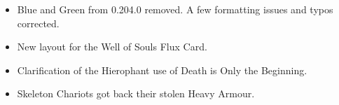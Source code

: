 
\subtitle{Layout}

\begin{itemize}[label={-}]
\item Blue and Green from 0.204.0 removed. A few formatting issues and typos corrected.
\item New layout for the Well of Souls Flux Card.
\end{itemize}


\subtitle{Model Rules}

\begin{itemize}[label={-}]
\item Clarification of the Hierophant use of Death is Only the Beginning.
\end{itemize}

%

\subtitle{Army List and Units}

\begin{itemize}[label={-}]
\item Skeleton Chariots got back their stolen Heavy Armour.
\end{itemize}

%
